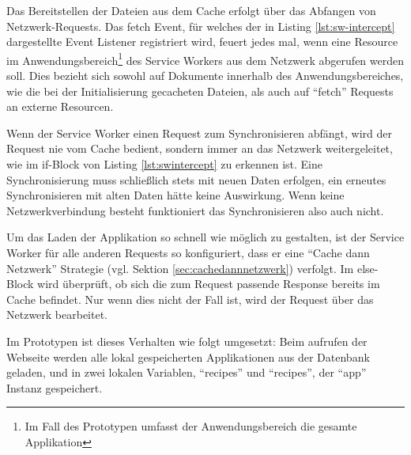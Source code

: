 \documentclass[a4paper, 12pt]{scrreprt}
\begin{document}
\begin{minipage}{\linewidth}
	
\end{minipage}

\begin{minipage}{\linewidth}
	
\end{minipage}

Das Bereitstellen der Dateien aus dem Cache erfolgt über das Abfangen von Netzwerk-Requests. Das fetch Event, für welches der in Listing \ref{lst:sw-intercept} dargestellte Event Listener registriert wird, feuert jedes mal, wenn eine Resource im Anwendungsbereich\footnote{Im Fall des Prototypen umfasst der Anwendungsbereich die gesamte Applikation} des Service Workers aus dem Netzwerk abgerufen werden soll. Dies bezieht sich sowohl auf Dokumente innerhalb des Anwendungsbereiches, wie die bei der Initialisierung gecacheten Dateien, als auch auf \enquote{fetch} Requests an externe Resourcen.

Wenn der Service Worker einen Request zum Synchronisieren abfängt, wird der Request nie vom Cache bedient, sondern immer an das Netzwerk weitergeleitet, wie im if-Block von Listing \ref{lst:swintercept} zu erkennen ist. Eine Synchronisierung muss schließlich stets mit neuen Daten erfolgen, ein erneutes Synchronisieren mit alten Daten hätte keine Auswirkung. Wenn keine Netzwerkverbindung besteht funktioniert das Synchronisieren also auch nicht.

Um das Laden der Applikation so schnell wie möglich zu gestalten, ist der Service Worker für alle anderen Requests so konfiguriert, dass er eine \enquote{Cache dann Netzwerk} Strategie (vgl. Sektion \ref{sec:cachedannnetzwerk}) verfolgt. Im else-Block wird überprüft, ob sich die zum Request passende Response bereits im Cache befindet. Nur wenn dies nicht der Fall ist, wird der Request über das Netzwerk bearbeitet.

\begin{minipage}{\linewidth}
	
\end{minipage}

Im Prototypen ist dieses Verhalten wie folgt umgesetzt: 
Beim aufrufen der Webseite werden alle lokal gespeicherten Applikationen aus der Datenbank geladen, und in zwei lokalen Variablen, \enquote{recipes} und \enquote{recipes}, der \enquote{app} Instanz gespeichert. 
\end{document}
